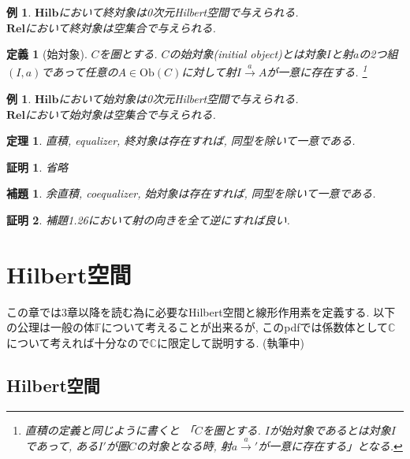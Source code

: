 \documentclass[a4paper,12pt]{ltjsarticle}
\theoremstyle{break}
\newtheorem{defn}[thm]{定義}
\newtheorem{lem}[thm]{補題}
\newtheorem{thrm}[thm]{定理}
\newtheorem{eg}[thm]{例}
\newtheorem*{prf}{証明}
\newcommand{\rel}{\mathbf{Rel}}
\newcommand{\hilb}{\mathbf{Hilb}}
\newcommand{\mbc}{\mathbb{C}}
\newcommand{\Ob}{\mathrm{Ob}}
\newcommand{\xr}[1]{\xrightarrow{#1}}
\numberwithin{equation}{section}
\begin{document}
\begin{eg}
  $\hilb$において終対象は0次元Hilbert空間で与えられる. \\
  $\rel$において終対象は空集合で与えられる. 
\end{eg}

\begin{defn}[始対象]
  $C$を圏とする. 
  $C$の始対象(initial object)とは対象$I$と射$a$の2つ組$(I,a)$であって任意の$A \in \Ob(C)$に対して射$I \xr{a} A$が一意に存在する.
  \footnote{
  直積の定義と同じように書くと 「$C$を圏とする. 
  $I$が始対象であるとは対象$I$であって, ある$I'$が圏$C$の対象となる時, 射$a \xr a'$が一意に存在する」となる. 
  } 
\end{defn}

\begin{eg}
  $\hilb$において始対象は0次元Hilbert空間で与えられる. \\
  $\rel$において始対象は空集合で与えられる. 
\end{eg}

\begin{thrm}
  直積, equalizer, 終対象は存在すれば, 同型を除いて一意である. 
\end{thrm}

\begin{prf}
  省略
\end{prf}

\begin{lem}
  余直積, coequalizer, 始対象は存在すれば, 同型を除いて一意である. 
\end{lem}  

\begin{prf}
  補題1.26において射の向きを全て逆にすれば良い. 
\end{prf}

\newpage

\section{Hilbert空間}

この章では3章以降を読む為に必要なHilbert空間と線形作用素を定義する. 
以下の公理は一般の体$\mathbb{F}$について考えることが出来るが, このpdfでは係数体として$\mbc$について考えれば十分なので$\mbc$に限定して説明する.
(執筆中)

\subsection{Hilbert空間}
\end{document}
